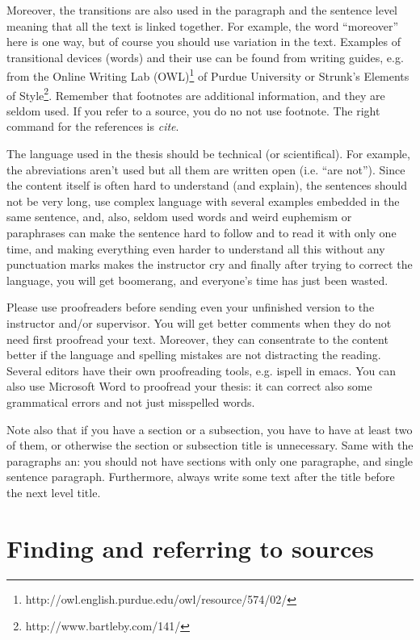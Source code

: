 \documentclass[12pt,a4paper,oneside,pdftex]{report}
\begin{document}
Moreover, the transitions are also used in the paragraph and the
sentence level meaning that all the text is linked together. For example,
the word ``moreover'' here is one way, but of course you should use
variation in the text. Examples of transitional devices (words) and
their use can be found from writing guides, e.g. from the Online
Writing Lab
(OWL)\footnote{http://owl.english.purdue.edu/owl/resource/574/02/} of
Purdue University or Strunk's Elements of
Style\footnote{http://www.bartleby.com/141/}. Remember that footnotes
are additional information, and they are seldom used.  If you refer to a source, you do no
not use footnote. The right command for the references is \emph{cite}.

The language used in the thesis should be technical (or
scientifical). For example, the abreviations aren't used but all them
are written open (i.e. ``are not''). Since the content itself is often
hard to understand (and explain), the sentences should not be very
long, use complex language with several examples embedded in the same
sentence, and, also, seldom used words and weird euphemism or paraphrases
can make the sentence hard to follow and to read it with only one
time, and making everything even harder to understand all this without
any punctuation marks makes the instructor cry and finally after
trying to correct the language, you will get boomerang, and everyone's
time has just been wasted.

Please use proofreaders before sending even your unfinished version to
the instructor and/or supervisor. You will get better comments when
they do not need first proofread your text. Moreover, they can
consentrate to the content better if the language and spelling
mistakes are not distracting the reading. Several editors have their
own proofreading tools, e.g. ispell in emacs. You can also use
Microsoft Word to proofread your thesis: it can correct also some
grammatical errors and not just misspelled words.

Note also that if you have a section or a subsection, you have to have
at least two of them, or otherwise the section or subsection title is
unnecessary. Same with the paragraphs an: you should not have sections
with only one paragraphe, and single sentence paragraph. Furthermore,
always write some text after the title before the next level title.

\section{Finding and referring to sources}
\end{document}

